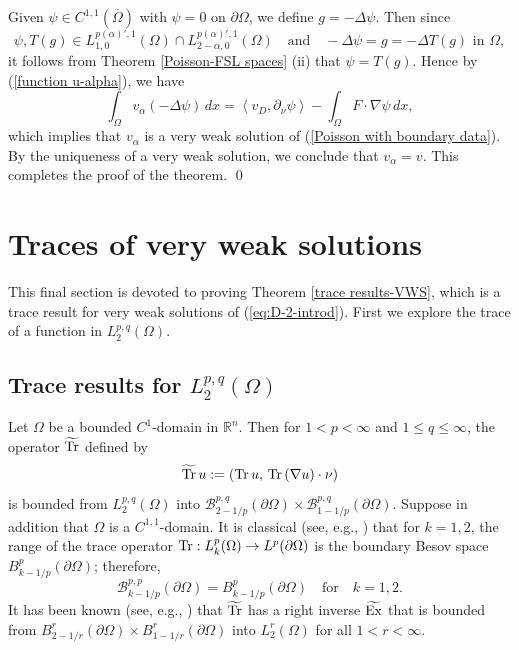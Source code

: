 \documentclass[reqno,centertags,11pt]{amsart}
\theoremstyle{definition}
\numberwithin{thm}{section}
\numberwithin{equation}{section}
\newcommand{\R}{{\mathbb{R}}}
\begin{document}
Given $\psi \in C^{1,1} (\overline{\Omega} )$ with $\psi =0$ on $\partial\Omega$, we define  $g =-\Delta \psi$. Then since
$$
\psi , T(g) \in L_{1,0}^{p(\alpha)',1} (\Omega ) \cap  L_{2-\alpha, 0}^{p(\alpha)' ,1}(\Omega )\quad\mbox{and}\quad -\Delta \psi =g =-\Delta T(g)\,\,\mbox{in}\,\, \Omega,
$$
it follows from  Theorem \ref{Poisson-FSL spaces} (ii) that $\psi =T(g)$. Hence by  (\ref{function u-alpha}), we have
\[
 \int_\Omega v_\alpha (- \Delta
 \psi ) \, dx =\left\langle v_D ,   \partial_\nu  \psi   \right\rangle -  \int_\Omega F \cdot \nabla
 \psi\, d x ,
\]
which implies that $v_\alpha$ is a very weak solution  of  (\ref{Poisson with boundary data}). By the uniqueness of a very weak solution, we conclude that $v_\alpha =v$. This completes the proof of the theorem.
\qed






\section{Traces of      very weak solutions}

This final section is devoted to proving Theorem \ref{trace results-VWS}, which is a trace result  for     very weak solutions     of  (\ref{eq:D-2-introd}).
First we explore the trace of a  function   in $L^{p,q}_{2}(\Omega)$.

\subsection{Trace results for $L_2^{p,q} (\Omega )$}


Let $\Omega$ be a bounded $C^{1}$-domain  in $\R^n$.
Then for $1<p<\infty$ and $1 \le q \le \infty$, the operator $\widetilde{\rm Tr}$ defined by
\[
\widetilde{\rm Tr}\,u := \left( {\rm Tr }\, u ,\,  {\rm Tr} \,(\nabla u) \cdot \nu \right)
\]
is bounded from $L^{p,q}_{2}(\Omega)$ into
$\mathcal{B}^{p,q}_{2-1/p}(\partial \Omega)\times \mathcal{B}^{p,q}_{1-1/p}(\partial \Omega)$. Suppose in addition that $\Omega$ is  a   $C^{1,1}$-domain.
It is classical (see, e.g., \cite[Subsection 2.5.7]{Ne}) that for $k=1,2$, the range of the trace operator ${\rm Tr} : L_k^p (\Omega ) \to L^p (\partial\Omega )$ is the boundary Besov space $B_{k-1/p}^p (\partial \Omega )$; therefore,
\[%
\mathcal{B}^{p,p}_{k-1/p}(\partial \Omega) = B_{k-1/p}^p (\partial\Omega ) \quad\mbox{for}\quad k=1,2 .
\]%
It has been known (see, e.g.,  \cite[Subsection 2.5.7]{Ne}) that $\widetilde{\rm Tr} $   has a right inverse $\widetilde{\rm  Ex}$ that is bounded from  $B^{r}_{2-1/r}(\partial \Omega)\times B^{r}_{1-1/r}(\partial \Omega)$  into $L^{r}_{2}(\Omega)$ for all $1<r<\infty$.
\end{document}
